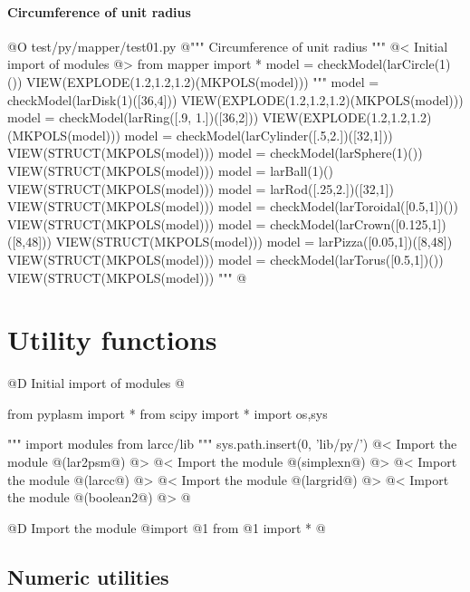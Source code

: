 \documentclass[11pt,oneside]{article}	%
\begin{document}
\paragraph{Circumference of unit radius}

@O test/py/mapper/test01.py
@{""" Circumference of unit radius """
@< Initial import of modules @>
from mapper import *
model = checkModel(larCircle(1)())
VIEW(EXPLODE(1.2,1.2,1.2)(MKPOLS(model)))
"""
model = checkModel(larDisk(1)([36,4]))
VIEW(EXPLODE(1.2,1.2,1.2)(MKPOLS(model)))
model = checkModel(larRing([.9, 1.])([36,2]))
VIEW(EXPLODE(1.2,1.2,1.2)(MKPOLS(model)))
model = checkModel(larCylinder([.5,2.])([32,1]))
VIEW(STRUCT(MKPOLS(model)))
model = checkModel(larSphere(1)())
VIEW(STRUCT(MKPOLS(model)))
model = larBall(1)()
VIEW(STRUCT(MKPOLS(model)))
model = larRod([.25,2.])([32,1])
VIEW(STRUCT(MKPOLS(model)))
model = checkModel(larToroidal([0.5,1])())
VIEW(STRUCT(MKPOLS(model)))
model = checkModel(larCrown([0.125,1])([8,48]))
VIEW(STRUCT(MKPOLS(model)))
model = larPizza([0.05,1])([8,48])
VIEW(STRUCT(MKPOLS(model)))
model = checkModel(larTorus([0.5,1])())
VIEW(STRUCT(MKPOLS(model)))
"""
@}


\appendix
\section{Utility functions}

@D Initial import of modules
@{from pyplasm import *
from scipy import *
import os,sys

""" import modules from larcc/lib """
sys.path.insert(0, 'lib/py/')
@< Import the module @(lar2psm@) @>
@< Import the module @(simplexn@) @>
@< Import the module @(larcc@) @>
@< Import the module @(largrid@) @>
@< Import the module @(boolean2@) @>
@}

@D Import the module
@{import @1
from @1 import *
@}


\subsection{Numeric utilities}
\end{document}
